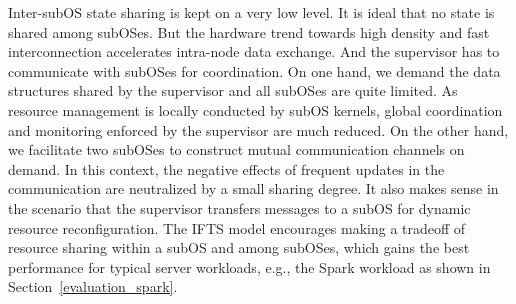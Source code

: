 \documentclass[pageno]{jpaper}
\begin{document}
Inter-subOS state sharing is kept on a very low level. It is ideal that no state is shared among subOSes.
But the hardware trend towards high density and fast interconnection accelerates intra-node data exchange. And the supervisor has to communicate with subOSes for coordination.
On one hand, we demand the data structures shared by the supervisor and all subOSes are quite limited. As resource management is locally  conducted by subOS kernels, global coordination and monitoring enforced by the supervisor are much reduced. On the other hand, we facilitate  two subOSes to construct mutual communication channels on demand. In this context, the negative effects of frequent updates in the communication are neutralized by  a small sharing degree. It also makes sense in the  scenario that the supervisor transfers messages to a subOS for dynamic resource reconfiguration. The IFTS model encourages  making a tradeoff of resource sharing  within a subOS and among subOSes, which gains the best performance for typical server workloads, e.g., the  Spark workload as shown in Section~\ref{evaluation_spark}.
\end{document}
